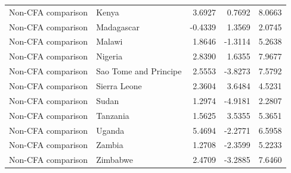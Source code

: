 \begin{table}
\begin{tabular}[t]{llrrr}
Non-CFA comparison & Kenya & 3.6927 & 0.7692 & 8.0663\\
\addlinespace
Non-CFA comparison & Madagascar & -0.4339 & 1.3569 & 2.0745\\
Non-CFA comparison & Malawi & 1.8646 & -1.3114 & 5.2638\\
Non-CFA comparison & Nigeria & 2.8390 & 1.6355 & 7.9677\\
Non-CFA comparison & Sao Tome and Principe & 2.5553 & -3.8273 & 7.5792\\
Non-CFA comparison & Sierra Leone & 2.3604 & 3.6484 & 4.5231\\
\addlinespace
Non-CFA comparison & Sudan & 1.2974 & -4.9181 & 2.2807\\
Non-CFA comparison & Tanzania & 1.5625 & 3.5355 & 5.3651\\
Non-CFA comparison & Uganda & 5.4694 & -2.2771 & 6.5958\\
Non-CFA comparison & Zambia & 1.2708 & -2.3599 & 5.2233\\
Non-CFA comparison & Zimbabwe & 2.4709 & -3.2885 & 7.6460\\
\bottomrule
\end{tabular}
\end{table}